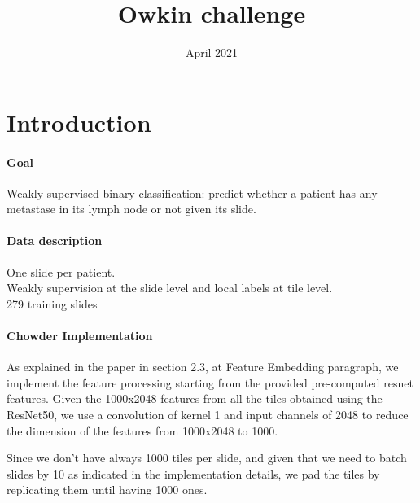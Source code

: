 \documentclass{article}
\title{Owkin challenge}
\author{ }
\date{April 2021}
\begin{document}
\maketitle

\section{Introduction}

\paragraph{Goal}
Weakly supervised binary classification: predict whether a patient has any metastase in its lymph node or not given its slide.

\paragraph{Data description}
One slide per patient. \\
Weakly supervision at the slide level and local labels at tile level.\\
279 training slides


\paragraph{Chowder Implementation}
As explained in the paper in section 2.3, at Feature Embedding paragraph, we implement the feature processing starting from the provided pre-computed resnet features. 
Given the 1000x2048 features from all the tiles obtained using the ResNet50, we use a convolution of kernel 1 and input channels of 2048 to reduce the dimension of the features from 1000x2048 to 1000.


Since we don't have always 1000 tiles per slide, and given that we need to batch slides by 10 as indicated in the implementation details, we pad the tiles by replicating them until having 1000 ones.



\end{document}
